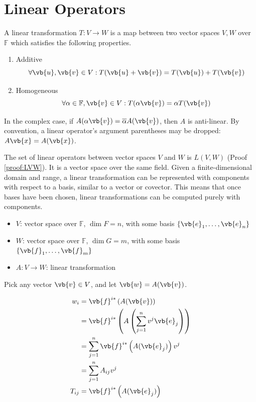 \section{Linear Operators}

\begin{definition}
	A linear transformation $T: V \rightarrow W$ is a map between two vector spaces $V, W$ over $\mathbb{F}$ which satisfies the following properties.
	\begin{enumerate}
		\item Additive
		\begin{equation}
			\forall \vb{u}, \vb{v} \in V: T(\vb{u} + \vb{v}) = T(\vb{u}) + T(\vb{v})
		\end{equation}
		\item Homogeneous
		\begin{equation}
			\forall \alpha \in \mathbb{F}, \vb{v} \in V: T(\alpha \vb{v}) = \alpha T(\vb{v})
		\end{equation}
	\end{enumerate}
\end{definition}

In the complex case, if $A(\alpha \vb{v}) = \overline{\alpha} A(\vb{v})$, then $A$ is anti-linear. By convention, a linear operator's argument parentheses may be dropped: $A \vb{x} = A(\vb{x})$.

The set of linear operators between vector spaces $V$ and $W$ is $L(V, W)$ (Proof \ref{proof:LVW}). It is a vector space over the same field. Given a finite-dimensional domain and range, a linear transformation can be represented with components with respect to a basis, similar to a vector or covector. This means that once bases have been chosen, linear transformations can be computed purely with components.

\begin{itemize}
	\item $V$: vector space over $\mathbb{F}$, $\dim{F} = n$, with some basis $\{ \vb{e}_{1}, \dots, \vb{e}_{n} \}$
	\item $W$: vector space over $\mathbb{F}$, $\dim{G} = m$, with some basis $\{ \vb{f}_{1}, \dots, \vb{f}_{m} \}$
	\item $A: V \rightarrow W$: linear transformation
\end{itemize}

Pick any vector $\vb{v} \in V$, and let $\vb{w} = A(\vb{v})$.

\begin{align*}
	w_{i} &= \vb{f}^{i*} \left( A(\vb{v}) \right) \\
	&= \vb{f}^{i*} \left( A \left( \sum_{j = 1}^{n} v^{j} \vb{e}_{j} \right) \right) \\
	&= \sum_{j = 1}^{n} \vb{f}^{i*} \left(A( \vb{e}_{j}) \right) v^{j} \\
	&= \sum_{j = 1}^{n} A_{ij} v^{j} \\
	T_{ij} &= \vb{f}^{i*} \left(A( \vb{e}_{j}) \right)
\end{align*}

